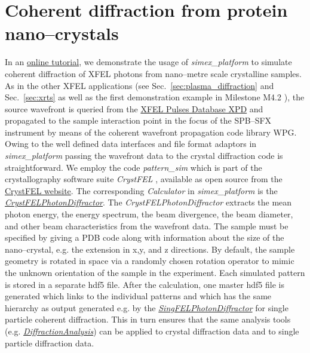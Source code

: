 \documentclass[12pt]{scrartcl}
\begin{document}
\section{Coherent diffraction from protein nano--crystals\label{sec:protein_sfx}}
In an
\href{https://github.com/eucall-software/simex_platform/wiki/Tutorial-on-nano-crystal-diffraction}{online
tutorial}, we demonstrate the usage of \textit{simex\_platform} to simulate
coherent diffraction of XFEL photons from nano--metre scale crystalline samples.
As in the other XFEL applications (see Sec.~\ref{sec:plasma_diffraction} and
Sec.~\ref{sec:xrts} as well as the first demonstration example in Milestone
M4.2 \cite{EUCALL_SIMEX_M4.2}), the source wavefront is queried from the
\href{https://in.xfel.eu/xpd}{XFEL Pulses Database XPD} and propagated to the
sample interaction point in the focus of the SPB--SFX instrument by means of
the coherent wavefront propagation code library WPG. Owing to the well defined
data interfaces and file format adaptors in \textit{simex\_platform} passing the
wavefront data to the crystal diffraction code is straightforward. We employ the
code \textit{pattern\_sim} which is part of the crystallography software suite
\textit{CrystFEL} \cite{White2012}, available as open source from the
\href{https://www.desy.de/~twhite/crystfel}{CrystFEL website}. The
corresponding \textit{Calculator} in \textit{simex\_platform} is the
\href{https://eucall-software.github.io/simex_platform/#SimEx.Calculators.CrystFELPhotonDiffractor.CrystFELPhotonDiffractor}{\textit{CrystFELPhotonDiffractor}}.
The \textit{CrystFELPhotonDiffractor} extracts the mean photon energy, the energy
spectrum, the beam divergence, the beam diameter, and other beam characteristics
from the wavefront data. The sample must be specified by giving a PDB code along
with information about the size of the nano--crystal, e.g. the extension in x,y,
and z directions. By default, the sample geometry is rotated in space via a
randomly chosen rotation operator to mimic the unknown orientation of the sample
in the experiment. Each simulated pattern is stored in a separate hdf5 file.
After the calculation, one master hdf5 file is generated which links to the
individual patterns and which has the same hierarchy as output generated e.g. by
the
\href{https://eucall-software.github.io/simex_platform/#SimEx.Calculators.SingFELPhotonDiffractor.SingFELPhotonDiffractor}{\textit{SingFELPhotonDiffractor}}
for single particle coherent diffraction. This in turn ensures that the same
analysis tools (e.g.
\href{https://eucall-software.github.io/simex_platform/#SimEx.Analysis.DiffractionAnalysis.DiffractionAnalysis}{\textit{DiffractionAnalysis}})
can be applied to crystal diffraction data and to single particle diffraction
data.
%
\end{document}
